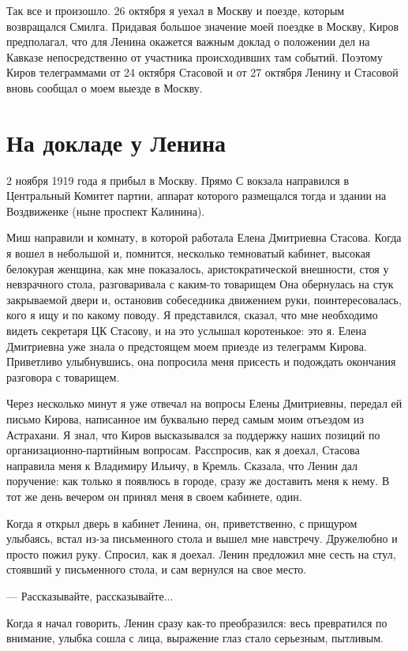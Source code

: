 \documentclass[12pt, a4paper, openany]{book}
\begin{document}
Так все и произошло. 26 октября я уехал в Москву и поезде, которым возвращался Смилга. Придавая большое значение моей поездке в Москву, Киров предполагал, что для Ленина окажется важным доклад о положении дел на Кавказе непосредственно от участника происходивших там событий. Поэтому Киров телеграммами от 24 октября Стасовой и от 27 октября Ленину и Стасовой вновь сообщал о моем выезде в Москву.

\newpage
\section[На докладе у Ленина]{\center \textbf{На докладе у Ленина}}


2 ноября 1919 года я прибыл в Москву. Прямо С вокзала направился в Центральный Комитет партии, аппарат которого размещался тогда и здании на Воздвиженке (ныне проспект Калинина).

Миш направили и комнату, в которой работала Елена Дмитриевна Стасова. Когда я вошел в небольшой и, помнится, несколько темноватый кабинет, высокая белокурая женщина, как мне показалось, аристократической внешности, стоя у невзрачного стола, разговаривала с каким-то товарищем Она обернулась на стук закрываемой двери и, остановив собеседника движением руки, поинтересовалась, кого я ищу и по какому поводу. Я представился, сказал, что мне необходимо видеть секретаря ЦК Стасову, и на это услышал коротенькое: это я. Елена Дмитриевна уже знала о предстоящем моем приезде из телеграмм Кирова. Приветливо улыбнувшись, она попросила меня присесть и подождать окончания разговора с товарищем.

Через несколько минут я уже отвечал на вопросы Елены Дмитриевны, передал ей письмо Кирова, написанное им буквально перед самым моим отъездом из Астрахани. Я знал, что Киров высказывался за поддержку наших позиций по организационно-партийным вопросам. Расспросив, как я доехал, Стасова направила меня к Владимиру Ильичу, в Кремль. Сказала, что Ленин дал поручение: как только я появлюсь в городе, сразу же доставить меня к нему. В тот же день вечером он принял меня в своем кабинете, один.

Когда я открыл дверь в кабинет Ленина, он, приветственно, с прищуром улыбаясь, встал из-за письменного стола и вышел мне навстречу. Дружелюбно и просто пожил руку. Спросил, как я доехал. Ленин предложил мне сесть на стул, стоявший у письменного стола, и сам вернулся на свое место.

— Рассказывайте, рассказывайте...

Когда я начал говорить, Ленин сразу как-то преобразился: весь превратился по внимание, улыбка сошла с лица, выражение глаз стало серьезным, пытливым.
\end{document}
